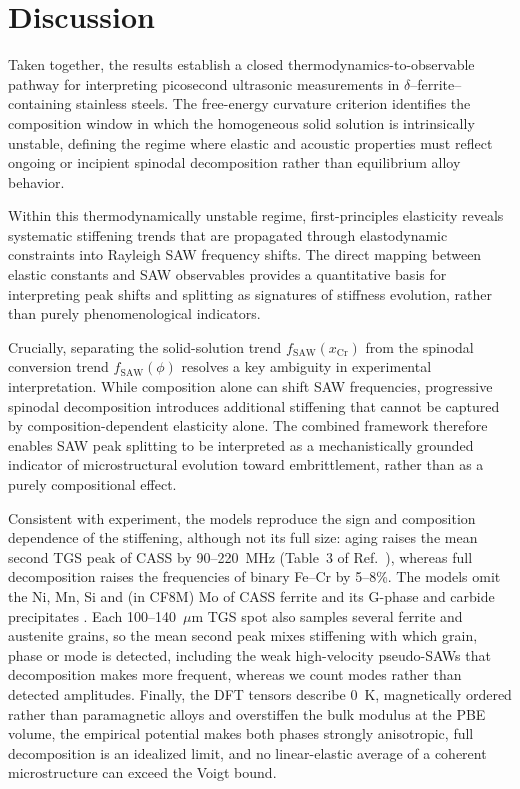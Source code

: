 \documentclass[final,3p,times]{elsarticle}
\begin{document}
\section{Discussion}

Taken together, the results establish a closed thermodynamics-to-observable pathway for interpreting picosecond ultrasonic measurements in $\delta$--ferrite–containing stainless steels. The free-energy curvature criterion identifies the composition window in which the homogeneous solid solution is intrinsically unstable, defining the regime where elastic and acoustic properties must reflect ongoing or incipient spinodal decomposition rather than equilibrium alloy behavior.

Within this thermodynamically unstable regime, first-principles elasticity reveals systematic stiffening trends that are propagated through elastodynamic constraints into Rayleigh SAW frequency shifts. The direct mapping between elastic constants and SAW observables provides a quantitative basis for interpreting peak shifts and splitting as signatures of stiffness evolution, rather than purely phenomenological indicators.

Crucially, separating the solid-solution trend $f_{\mathrm{SAW}}(x_{\mathrm{Cr}})$ from the spinodal conversion trend $f_{\mathrm{SAW}}(\phi)$ resolves a key ambiguity in experimental interpretation. While composition alone can shift SAW frequencies, progressive spinodal decomposition introduces additional stiffening that cannot be captured by composition-dependent elasticity alone. The combined framework therefore enables SAW peak splitting to be interpreted as a mechanistically grounded indicator of microstructural evolution toward embrittlement, rather than as a purely compositional effect.

Consistent with experiment, the models reproduce the sign and composition dependence of the stiffening, although not its full size: aging raises the mean second TGS peak of CASS by 90--220~MHz (Table~3 of Ref.~\cite{al2023detecting}), whereas full decomposition raises the frequencies of binary Fe--Cr by 5--8\%. The models omit the Ni, Mn, Si and (in CF8M) Mo of CASS ferrite and its G-phase and carbide precipitates \cite{byun2016thermal,lach2020precipitation}. Each 100--140~$\mu$m TGS spot also samples several ferrite and austenite grains, so the mean second peak mixes stiffening with which grain, phase or mode is detected, including the weak high-velocity pseudo-SAWs that decomposition makes more frequent, whereas we count modes rather than detected amplitudes. Finally, the DFT tensors describe 0~K, magnetically ordered rather than paramagnetic alloys and overstiffen the bulk modulus at the PBE volume, the empirical potential makes both phases strongly anisotropic, full decomposition is an idealized limit, and no linear-elastic average of a coherent microstructure can exceed the Voigt bound.
\end{document}
